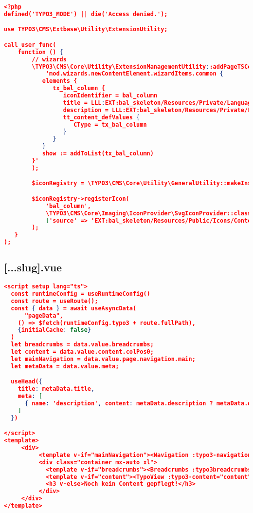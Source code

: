 \begin{lstlisting}[language=json,firstnumber=1]
<?php
defined('TYPO3_MODE') || die('Access denied.');

use TYPO3\CMS\Extbase\Utility\ExtensionUtility;

call_user_func(
    function () {
        // wizards
        \TYPO3\CMS\Core\Utility\ExtensionManagementUtility::addPageTSConfig(
            'mod.wizards.newContentElement.wizardItems.common {
           elements {
              tx_bal_column {
                 iconIdentifier = bal_column
                 title = LLL:EXT:bal_skeleton/Resources/Private/Language/Tca.xlf:bal_column.wizard.title
                 description = LLL:EXT:bal_skeleton/Resources/Private/Language/Tca.xlf:bal_column.wizard.description
                 tt_content_defValues {
                    CType = tx_bal_column
                 }
              }
           }
           show := addToList(tx_bal_column)
        }'
        );

        $iconRegistry = \TYPO3\CMS\Core\Utility\GeneralUtility::makeInstance(\TYPO3\CMS\Core\Imaging\IconRegistry::class);

        $iconRegistry->registerIcon(
            'bal_column',
            \TYPO3\CMS\Core\Imaging\IconProvider\SvgIconProvider::class,
            ['source' => 'EXT:bal_skeleton/Resources/Public/Icons/ContentElements/stage.svg']
        );
   }
);
\end{lstlisting}

\subsection{[...slug].vue}
\label{[...slug].vue}

\begin{lstlisting}[language=json,firstnumber=1]
<script setup lang="ts">
  const runtimeConfig = useRuntimeConfig()
  const route = useRoute();
  const { data } = await useAsyncData(
      "pageData",
    () => $fetch(runtimeConfig.typo3 + route.fullPath),
    {initialCache: false}
  )
  let breadcrumbs = data.value.breadcrumbs;
  let content = data.value.content.colPos0;
  let mainNavigation = data.value.page.navigation.main;
  let metaData = data.value.meta;

  useHead({
    title: metaData.title,
    meta: [
      { name: 'description', content: metaData.description ? metaData.description : '' }
    ]
  })

</script>
<template>
     <div>
          <template v-if="mainNavigation"><Navigation :typo3-navigation="mainNavigation"></Navigation></template>
          <div class="container mx-auto xl">
            <template v-if="breadcrumbs"><Breadcrumbs :typo3breadcrumbs="breadcrumbs"></Breadcrumbs></template>
            <template v-if="content"><TypoView :typo3-content="content"></TypoView></template>
            <h3 v-else>Noch kein Content gepflegt!</h3>
          </div>
     </div>
</template>
\end{lstlisting}

